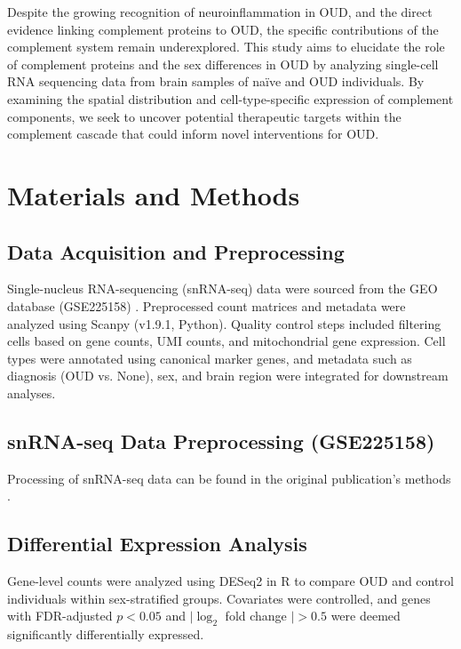 \documentclass[10pt,letterpaper]{article}
\begin{document}
Despite the growing recognition of neuroinflammation in OUD, and the direct evidence linking complement proteins to OUD, the specific contributions of the complement system remain underexplored. This study aims to elucidate the role of complement proteins and the sex differences in OUD by analyzing single-cell RNA sequencing data from brain samples of naïve and OUD individuals. By examining the spatial distribution and cell-type-specific expression of complement components, we seek to uncover potential therapeutic targets within the complement cascade that could inform novel interventions for OUD.


\section*{Materials and Methods}

\subsection*{Data Acquisition and Preprocessing}
Single-nucleus RNA-sequencing (snRNA-seq) data were sourced from the GEO database (GSE225158) \cite{Phan2024}. Preprocessed count matrices and metadata were analyzed using Scanpy (v1.9.1, Python). Quality control steps included filtering cells based on gene counts, UMI counts, and mitochondrial gene expression. Cell types were annotated using canonical marker genes, and metadata such as diagnosis (OUD vs. None), sex, and brain region were integrated for downstream analyses.

\subsection*{snRNA-seq Data Preprocessing (GSE225158)}
Processing of snRNA-seq data can be found in the original publication's methods \cite{Phan2024}.

\subsection*{Differential Expression Analysis}
Gene-level counts were analyzed using DESeq2 \cite{Love2014DESeq2} in R to compare OUD and control individuals within sex-stratified groups. Covariates were controlled, and genes with FDR-adjusted $p < 0.05$ and $|\log_2$ fold change $| > 0.5$ were deemed significantly differentially expressed.
\end{document}
